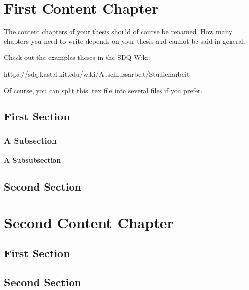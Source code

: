 
\chapter{First Content Chapter}
\label{ch:FirstContent}

The content chapters of your thesis should of course be renamed. How many
chapters you need to write depends on your thesis and cannot be said in general.

Check out the examples theses in the SDQ Wiki:

\url{https://sdq.kastel.kit.edu/wiki/Abschlussarbeit/Studienarbeit}

Of course, you can split this .tex file into several files if you prefer. 


\section{First Section}
\label{sec:FirstContent:FirstSection}

\Blindtext

\subsection{A Subsection}
\label{sec:FirstContent:FirstSubSection}

\Blindtext

\subsubsection{A Subsubsection}

\Blindtext[1]

\section{Second Section}
\label{sec:FirstContent:SecondSection}

\Blindtext


\chapter{Second Content Chapter}
\label{ch:SecondContent}

\Blindtext

\section{First Section}
\label{sec:SecondContent:FirstSection}

\Blindtext

\section{Second Section}
\label{sec:SecondContent:SecondSection}

\Blindtext

